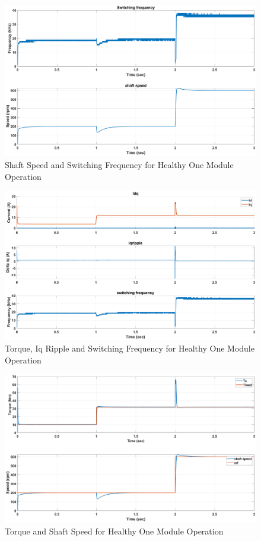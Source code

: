 \documentclass{article}
\begin{document}
\begin{figure}[h!]
\centering
\includegraphics[scale=0.35]{SimulationResults/one_module/speed_fsw.eps}
\caption{Shaft Speed and Switching Frequency for Healthy One Module Operation}
\label{fig:ShaftSpeedFswOneModuleHealthy}
\end{figure}

\begin{figure}[h!]
\centering
\includegraphics[scale=0.35]{SimulationResults/one_module/te_iqripple_fsw.eps}
\caption{Torque, Iq Ripple and Switching Frequency for Healthy One Module Operation}
\label{fig:TorqueIqrippleFswOneModuleHealthy}
\end{figure}

\begin{figure}[h!]
\centering
\includegraphics[scale=0.35]{SimulationResults/one_module/te_speed.eps}
\caption{Torque and Shaft Speed for Healthy One Module Operation}
\label{fig:TorqueShaftSpeedOneModuleHealthy}
\end{figure}
\end{document}
